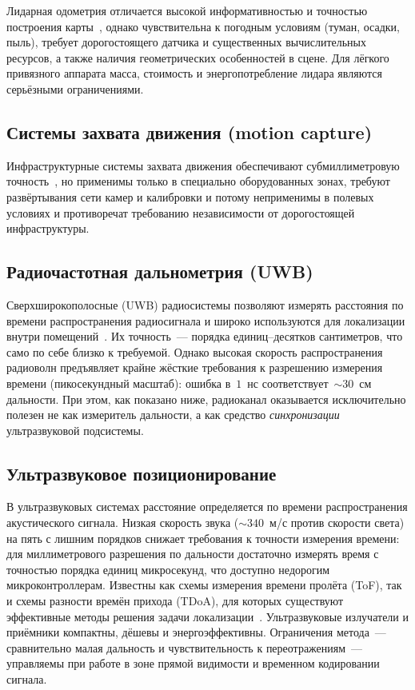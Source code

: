 Лидарная одометрия отличается высокой информативностью и точностью построения
карты~\cite{zhang2014loam}, однако чувствительна к погодным условиям (туман, осадки, пыль), требует
дорогостоящего датчика и существенных вычислительных ресурсов, а также наличия
геометрических особенностей в сцене. Для лёгкого привязного аппарата масса,
стоимость и энергопотребление лидара являются серьёзными ограничениями.

\subsection{Системы захвата движения (motion capture)}

Инфраструктурные системы захвата движения обеспечивают субмиллиметровую точность~\cite{merriaux2017},
но применимы только в специально оборудованных зонах, требуют развёртывания сети
камер и калибровки и потому неприменимы в полевых условиях и противоречат
требованию независимости от дорогостоящей инфраструктуры.

\subsection{Радиочастотная дальнометрия (UWB)}

Сверхширокополосные (UWB) радиосистемы позволяют измерять расстояния по времени
распространения радиосигнала и широко используются для локализации внутри
помещений~\cite{gezici2005}. Их точность~--- порядка единиц--десятков сантиметров, что само по себе
близко к требуемой. Однако высокая скорость распространения радиоволн предъявляет
крайне жёсткие требования к разрешению измерения времени (пикосекундный масштаб):
ошибка в~$1$~нс соответствует~${\sim}30$~см дальности. При этом, как показано ниже,
радиоканал оказывается исключительно полезен не как измеритель дальности, а как
средство \emph{синхронизации} ультразвуковой подсистемы.

\subsection{Ультразвуковое позиционирование}

В ультразвуковых системах расстояние определяется по времени распространения
акустического сигнала. Низкая скорость звука (${\sim}340$~м/с против скорости
света) на пять с лишним порядков снижает требования к точности измерения времени:
для миллиметрового разрешения по дальности достаточно измерять время с точностью
порядка единиц микросекунд, что доступно недорогим микроконтроллерам.
Известны как схемы измерения времени пролёта (ToF), так и схемы разности времён
прихода (TDoA), для которых существуют эффективные методы решения задачи
локализации~\cite{smith1987,chan1994}. Ультразвуковые излучатели и приёмники
компактны, дёшевы и энергоэффективны. Ограничения метода~--- сравнительно малая
дальность и чувствительность к переотражениям~--- управляемы при работе в зоне
прямой видимости и временном кодировании сигнала.

